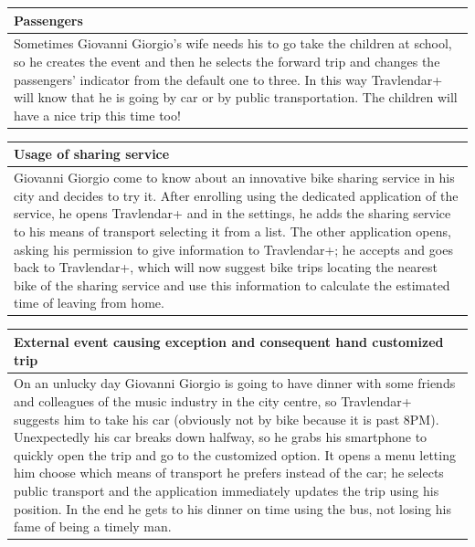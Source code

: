 %
\begin{center}
\def\arraystretch{1.5}
  \begin{tabular}{ | p{} | }
    \hline
    Passengers \\ \hline
    Sometimes Giovanni Giorgio's wife needs his to go take the children at school, so he creates the event and then he selects the forward trip and changes the passengers’ indicator from the default one to three. In this way Travlendar+ will know that he is going by car or by public transportation. The children will have a nice trip this time too! \\ \hline
  \end{tabular}
\end{center}
%
\begin{center}
\def\arraystretch{1.5}
  \begin{tabular}{ | p{} | }
    \hline
    Usage of sharing service \\ \hline
    Giovanni Giorgio come to know about an innovative bike sharing service in his city and decides to try it. After enrolling using the dedicated application of the service, he opens Travlendar+ and in the settings, he adds the sharing service to his means of transport selecting it from a list. The other application opens, asking his permission to give information to Travlendar+; he accepts and goes back to Travlendar+, which will now suggest bike trips locating the nearest bike of the sharing service and use this information to calculate the estimated time of leaving from home. \\ \hline
  \end{tabular}
\end{center}
%
\begin{center}
\def\arraystretch{1.5}
  \begin{tabular}{ | p{} | }
    \hline
    External event causing exception and consequent hand customized trip \\ \hline
    On an unlucky day Giovanni Giorgio is going to have dinner with some friends and colleagues of the music industry in the city centre, so Travlendar+ suggests him to take his car (obviously not by bike because it is past 8PM). Unexpectedly his car breaks down halfway, so he grabs his smartphone to quickly open the trip and go to the customized option. It opens a menu letting him choose which means of transport he prefers instead of the car; he selects public transport and the application immediately updates the trip using his position. In the end he gets to his dinner on time using the bus, not losing his fame of being a timely man.  \\ \hline
  \end{tabular}
\end{center}

